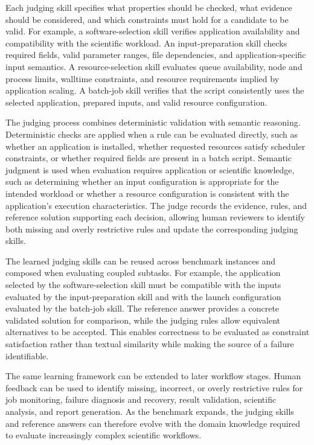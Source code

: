 \documentclass[conference]{IEEEtran}
\begin{document}
Each judging skill specifies what properties should be checked, what evidence should be considered, and which constraints must hold for a candidate to be valid. For example, a software-selection skill verifies application availability and compatibility with the scientific workload. An input-preparation skill checks required fields, valid parameter ranges, file dependencies, and application-specific input semantics. A resource-selection skill evaluates queue availability, node and process limits, walltime constraints, and resource requirements implied by application scaling. A batch-job skill verifies that the script consistently uses the selected application, prepared inputs, and valid resource configuration.

The judging process combines deterministic validation with semantic reasoning. Deterministic checks are applied when a rule can be evaluated directly, such as whether an application is installed, whether requested resources satisfy scheduler constraints, or whether required fields are present in a batch script. Semantic judgment is used when evaluation requires application or scientific knowledge, such as determining whether an input configuration is appropriate for the intended workload or whether a resource configuration is consistent with the application's execution characteristics. The judge records the evidence, rules, and reference solution supporting each decision, allowing human reviewers to identify both missing and overly restrictive rules and update the corresponding judging skills.

The learned judging skills can be reused across benchmark instances and composed when evaluating coupled subtasks. For example, the application selected by the software-selection skill must be compatible with the inputs evaluated by the input-preparation skill and with the launch configuration evaluated by the batch-job skill. The reference answer provides a concrete validated solution for comparison, while the judging rules allow equivalent alternatives to be accepted. This enables correctness to be evaluated as constraint satisfaction rather than textual similarity while making the source of a failure identifiable.

The same learning framework can be extended to later workflow stages. Human feedback can be used to identify missing, incorrect, or overly restrictive rules for job monitoring, failure diagnosis and recovery, result validation, scientific analysis, and report generation. As the benchmark expands, the judging skills and reference answers can therefore evolve with the domain knowledge required to evaluate increasingly complex scientific workflows.
\end{document}
